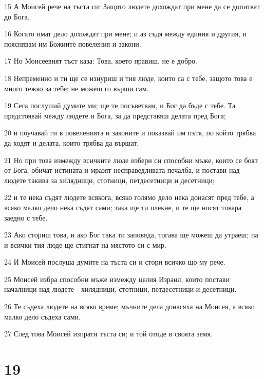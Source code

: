 \par 15 А Моисей рече на тъста си: Защото людете дохождат при мене да се допитват до Бога.
\par 16 Когато имат дело дохождат при мене; и аз съдя между единия и другия, и пояснявам им Божиите повеления и закони.
\par 17 Но Моисеевият тъст каза: Това, което правиш, не е добро.
\par 18 Непременно и ти ще се изнуриш и тия люде, които са с тебе, защото това е много тежко за тебе; не можеш го върши сам.
\par 19 Сега послушай думите ми; ще те посъветвам, и Бог да бъде с тебе. Та предстоявай между людете и Бога, за да представяш делата пред Бога;
\par 20 и поучавай ги в повеленията и законите и показвай им пътя, по който трябва да ходят и делата, които трябва да вършат.
\par 21 Но при това измежду всичките люде избери си способни мъже, които се боят от Бога, обичат истината и мразят несправедливата печалба, и постави над людете такива за хилядници, стотници, петдесетници и десетници;
\par 22 и те нека съдят людете всякога, всяко голямо дело нека донасят пред тебе, а всяко малко дело нека съдят сами; така ще ти олекне, и те ще носят товара заедно с тебе.
\par 23 Ако сториш това, и ако Бог така ти заповяда, тогава ще можеш да утраеш; па и всички тия люде ще стигнат на мястото си с мир.
\par 24 И Моисей послуша думите на тъста си и стори всичко що му рече.
\par 25 Моисей избра способни мъже измежду целия Израил, които постави началници над людете - хилядници, стотници, петдесетници и десетници.
\par 26 Те съдеха людете на всяко време; мъчните дела донасяха на Моисея, а всяко малко дело съдеха сами.
\par 27 След това Моисей изпрати тъста си; и той отиде в своята земя.

\chapter{19}

